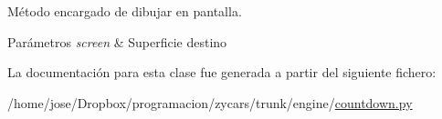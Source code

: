 \-Método encargado de dibujar en pantalla. 


\begin{DoxyParams}{\-Parámetros}
{\em screen} & \-Superficie destino \\
\hline
\end{DoxyParams}


\-La documentación para esta clase fue generada a partir del siguiente fichero\-:\begin{DoxyCompactItemize}
\item 
/home/jose/\-Dropbox/programacion/zycars/trunk/engine/\hyperlink{countdown_8py}{countdown.\-py}\end{DoxyCompactItemize}
